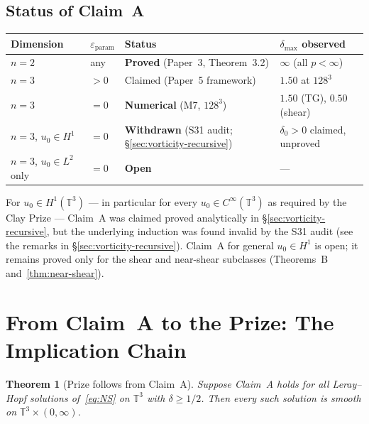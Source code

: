 \documentclass[11pt]{article}
\newtheorem{theorem}{Theorem}[section]
\theoremstyle{definition}
\theoremstyle{remark}
\newcommand{\T}{\mathbb{T}}
\newcommand{\dlt}{\delta}
\newcommand{\eps}{\varepsilon}
\begin{document}
\subsection{Status of Claim~A}

\begin{center}
\begin{tabular}{@{}llll@{}}
\toprule
Dimension & $\eps_{\mathrm{param}}$ & Status & $\dlt_{\max}$ observed \\
\midrule
$n=2$ & any & \textbf{Proved} (Paper~3, Theorem~3.2) & $\infty$ (all $p<\infty$) \\
$n=3$ & $>0$ & Claimed (Paper~5 framework) & $1.50$ at $128^3$ \\
$n=3$ & $=0$ & \textbf{Numerical} (M7, $128^3$) & $1.50$ (TG), $0.50$ (shear) \\
$n=3$, $u_0\in H^1$ & $=0$ & \textbf{Withdrawn} (S31 audit; §\ref{sec:vorticity-recursive}) & $\dlt_0>0$ claimed, unproved \\
$n=3$, $u_0\in L^2$ only & $=0$ & \textbf{Open} & — \\
\bottomrule
\end{tabular}
\end{center}

For $u_0\in H^1(\T^3)$ — in particular for every $u_0\in C^\infty(\T^3)$
as required by the Clay Prize — Claim~A was claimed proved analytically
in §\ref{sec:vorticity-recursive}, but the underlying induction was found
invalid by the S31 audit (see the remarks in §\ref{sec:vorticity-recursive}).
Claim~A for general $u_0\in H^1$ is open; it remains proved only for the
shear and near-shear subclasses (Theorems~B and~\ref{thm:near-shear}).

\section{From Claim~A to the Prize: The Implication Chain}
\label{sec:bootstrap}

\begin{theorem}[Prize follows from Claim~A]\label{thm:prize}
  Suppose Claim~A holds for all Leray--Hopf solutions of~\eqref{eq:NS} on
  $\T^3$ with $\dlt\geq 1/2$.  Then every such solution is smooth on
  $\T^3\times(0,\infty)$.
\end{theorem}
\end{document}
